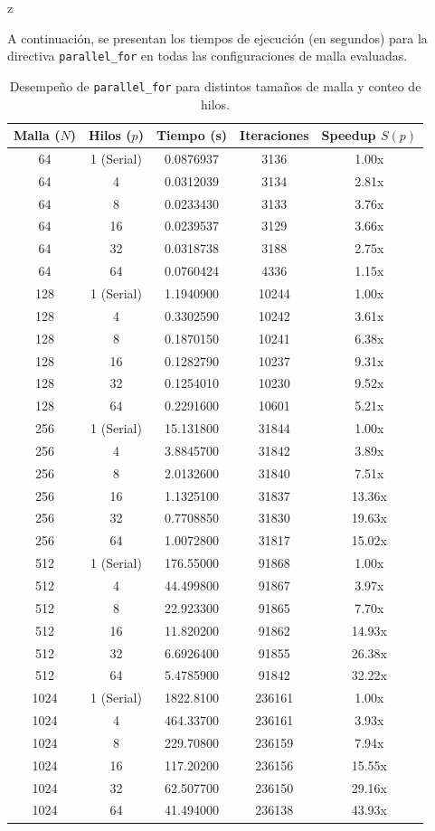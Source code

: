 z\documentclass[11pt,a4paper]{article}
\begin{document}
A continuación, se presentan los tiempos de ejecución (en segundos) para la directiva \texttt{parallel\_for} en todas las configuraciones de malla evaluadas.

\begin{table}[H]
\centering
\renewcommand{\arraystretch}{1.2}
\small
\begin{tabular}{|c|c|c|c|c|}
\hline
\textbf{Malla ($N$)} & \textbf{Hilos ($p$)} & \textbf{Tiempo (s)} & \textbf{Iteraciones} & \textbf{Speedup $S(p)$} \\ \hline
64 & 1 (Serial) & 0.0876937 & 3136 & 1.00x \\ 
64 & 4 & 0.0312039 & 3134 & 2.81x \\ 
64 & 8 & 0.0233430 & 3133 & 3.76x \\ 
64 & 16 & 0.0239537 & 3129 & 3.66x \\ 
64 & 32 & 0.0318738 & 3188 & 2.75x \\ 
64 & 64 & 0.0760424 & 4336 & 1.15x \\ \hline
128 & 1 (Serial) & 1.1940900 & 10244 & 1.00x \\ 
128 & 4 & 0.3302590 & 10242 & 3.61x \\ 
128 & 8 & 0.1870150 & 10241 & 6.38x \\ 
128 & 16 & 0.1282790 & 10237 & 9.31x \\ 
128 & 32 & 0.1254010 & 10230 & 9.52x \\ 
128 & 64 & 0.2291600 & 10601 & 5.21x \\ \hline
256 & 1 (Serial) & 15.131800 & 31844 & 1.00x \\ 
256 & 4 & 3.8845700 & 31842 & 3.89x \\ 
256 & 8 & 2.0132600 & 31840 & 7.51x \\ 
256 & 16 & 1.1325100 & 31837 & 13.36x \\ 
256 & 32 & 0.7708850 & 31830 & 19.63x \\ 
256 & 64 & 1.0072800 & 31817 & 15.02x \\ \hline
512 & 1 (Serial) & 176.55000 & 91868 & 1.00x \\ 
512 & 4 & 44.499800 & 91867 & 3.97x \\ 
512 & 8 & 22.923300 & 91865 & 7.70x \\ 
512 & 16 & 11.820200 & 91862 & 14.93x \\ 
512 & 32 & 6.6926400 & 91855 & 26.38x \\ 
512 & 64 & 5.4785900 & 91842 & 32.22x \\ \hline
1024 & 1 (Serial) & 1822.8100 & 236161 & 1.00x \\ 
1024 & 4 & 464.33700 & 236161 & 3.93x \\ 
1024 & 8 & 229.70800 & 236159 & 7.94x \\ 
1024 & 16 & 117.20200 & 236156 & 15.55x \\ 
1024 & 32 & 62.507700 & 236150 & 29.16x \\ 
1024 & 64 & 41.494000 & 236138 & 43.93x \\ \hline
\end{tabular}
\caption{Desempeño de \texttt{parallel\_for} para distintos tamaños de malla y conteo de hilos.}
\label{tab:resultados_parallel_for}
\end{table}
\end{document}
